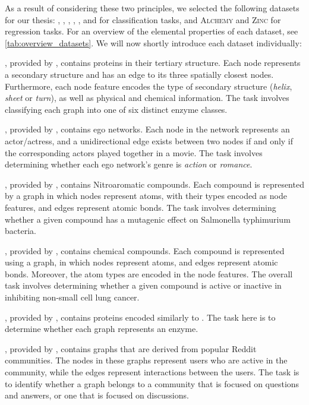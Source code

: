 As a result of considering these two principles, we selected the following datasets for our thesis: \enzymes, \imdb, \mutag, \nci, \proteins, and \reddit for classification tasks, and \textsc{Alchemy} and \textsc{Zinc} for regression tasks. For an overview of the elemental properties of each dataset, see \cref{tab:overview_datasets}. We will now shortly introduce each dataset individually:\par\medskip

\enzymes, provided by \cite{Borgwardt2005}, contains proteins in their tertiary structure. Each node represents a secondary structure and has an edge to its three spatially closest nodes. Furthermore, each node feature encodes the type of secondary structure (\textit{helix}, \textit{sheet} or \textit{turn}), as well as physical and chemical information. The task involves classifying each graph into one of six distinct enzyme classes.\par\medskip

\imdb, provided by \cite{Yanardag2015}, contains ego networks. Each node in the network represents an actor/actress, and a unidirectional edge exists between two nodes if and only if the corresponding actors played together in a movie. The task involves determining whether each ego network's genre is \textit{action} or \textit{romance}.\par\medskip

\mutag, provided by \cite{Debnath1991}, contains Nitroaromatic compounds. Each compound is represented by a graph in which nodes represent atoms, with their types encoded as node features, and edges represent atomic bonds. The task involves determining whether a given compound has a mutagenic effect on Salmonella typhimurium bacteria.\par\medskip

\nci, provided by \cite{Wale2008}, contains chemical compounds. Each compound is represented using a graph, in which nodes represent atoms, and edges represent atomic bonds. Moreover, the atom types are encoded in the node features. The overall task involves determining whether a given compound is active or inactive in inhibiting non-small cell lung cancer.\par\medskip

\proteins, provided by \cite{Borgwardt2005}, contains proteins encoded similarly to \enzymes. The task here is to determine whether each graph represents an enzyme.\par\medskip

\reddit, provided by \cite{Yanardag2015}, contains graphs that are derived from popular Reddit communities. The nodes in these graphs represent users who are active in the community, while the edges represent interactions between the users. The task is to identify whether a graph belongs to a community that is focused on questions and answers, or one that is focused on discussions.\par\medskip

